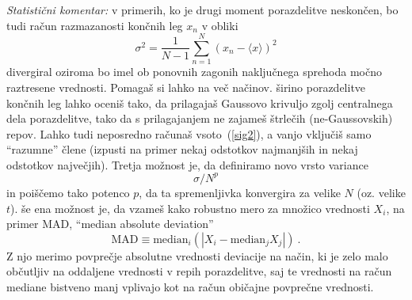 \documentclass[slovene,11pt,a4paper]{article}
\begin{document}
{\sl Statistični komentar:} v primerih, ko je drugi
moment porazdelitve neskončen, bo tudi račun razmazanosti
končnih leg $x_n$ v obliki
\begin{equation}
\sigma^2 = \frac{1}{N-1} \sum_{n=1}^N \left( x_n - \langle x \rangle \right)^2
\label{sig2}
\end{equation}
divergiral oziroma bo imel ob ponovnih zagonih naključnega sprehoda
močno raztresene vrednosti.  Pomagaš si lahko na več načinov.
širino porazdelitve končnih leg lahko oceniš tako, da prilagajaš
Gaussovo krivuljo zgolj centralnega dela porazdelitve, tako da
s prilagajanjem ne zajameš štrlečih (ne-Gaussovskih) repov.
Lahko tudi neposredno računaš vsoto~(\ref{sig2}), a vanjo
vključiš samo ``razumne'' člene (izpusti na primer nekaj
odstotkov najmanjših in nekaj odstotkov največjih).
Tretja možnost je, da definiramo novo vrsto variance
\begin{equation*}
  \sigma / N^p
\end{equation*}
in poiščemo tako potenco $p$, da ta spremenljivka konvergira
za velike $N$ (oz. velike $t$).  še ena možnost je, da vzameš
kako robustno mero za množico vrednosti $X_i$, na primer MAD,
``median absolute deviation''
\begin{equation*}
  \mathrm{MAD} \equiv \mathrm{median}_i\left( | X_i - \mathrm{median}_j X_j | \right) \>.
\end{equation*}
Z njo merimo povprečje absolutne vrednosti deviacije na način,
ki je zelo malo občutljiv na oddaljene vrednosti v repih porazdelitve,
saj te vrednosti na račun mediane bistveno manj vplivajo kot na
račun običajne povprečne vrednosti.

\newpage


\end{document}
